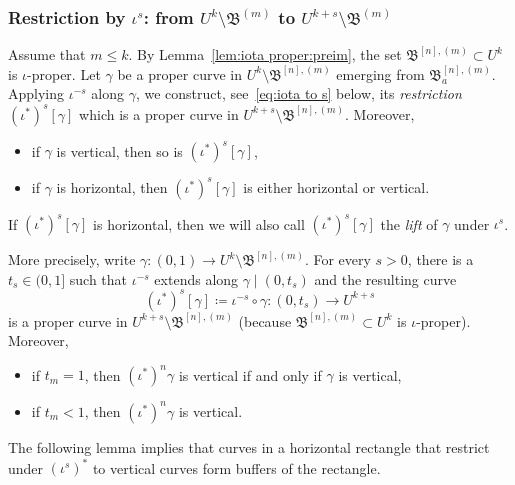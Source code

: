 \documentclass{amsart}
\newcommand{\bush}{{\mathfrak B }}
\newcommand{\bbush}{{\boldsymbol {\mathfrak B} }}
\newcommand{\1}{{\mathbb 1 }}
\begin{document}
\subsubsection{Restriction by $\iota^s$: from $U^{k}\setminus \bbush^{(m)}$ to $U^{k+s}\setminus \bbush^{(m)}$}\label{sss:WAD:imm} Assume that $m \le k$. By Lemma~\ref{lem:iota proper:preim}, the set $\bbush^{[n],(m)}\subset U^k$ is $\iota$-proper. Let $\gamma$ be a proper curve in $U^{k}\setminus \bbush^{[n],(m)}$ emerging from $\bush^{[n],(m)}_a$. Applying $\iota^{-s}$ along $\gamma$, we construct, see~\eqref{eq:iota to s} below, its \emph{restriction} $(\iota^{*})^s[\gamma]$ which is a proper curve in $U^{k+s}\setminus \bbush^{[n],(m)}$. Moreover, 
\begin{itemize}
\item if $\gamma$ is vertical, then so is  $(\iota^{*})^s[\gamma]$,
\item if $\gamma$ is horizontal, then $(\iota^{*})^s[\gamma]$ is either horizontal or vertical. 
\end{itemize}
If $(\iota^{*})^s[\gamma]$ is horizontal, then we will also call $(\iota^{*})^s[\gamma]$ the \emph{lift} of $\gamma$ under $\iota^s$.
 
 
 More precisely, write $\gamma\colon (0,1)\to U^k\setminus \bbush^{[n],(m)}$. For every $s>0$, there is a $t_s\in (0,1]$ such that $\iota^{-s}$ extends along $\gamma\mid (0,t_s)$ and the resulting curve 
 \begin{equation}\label{eq:iota to s}
 (\iota^{*})^s[\gamma]\coloneqq \iota^{-s}\circ \gamma\colon  (0,t_s) \to U^{k+s}\end{equation}
is a proper curve in $U^{k+s}\setminus \bbush^{[n],(m)}$ (because $\bbush^{[n],(m)}\subset  U^k$ is $\iota$-proper). Moreover,
\begin{itemize}
\item if $t_m=1$, then $(\iota^{*})^n\gamma$ is vertical if and only if $\gamma$ is vertical,
\item  if $t_m<1$, then $(\iota^{*})^n\gamma$ is vertical. 
\end{itemize}

The following lemma implies that curves in a horizontal rectangle that restrict under $(\iota^s)^*$ to vertical curves form buffers of the rectangle.
\end{document}
